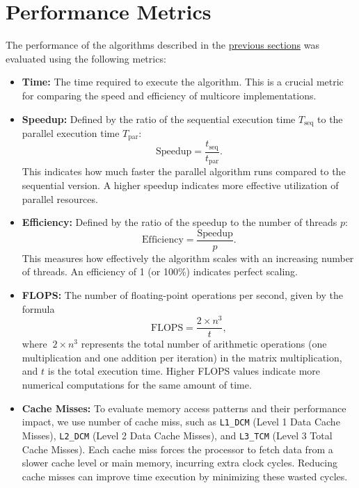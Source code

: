 \section{Performance Metrics}  \label{section:performance}
  The performance of the algorithms described in the \hyperref[section:algorithms]{previous sections} was evaluated using the following metrics:

\begin{itemize}
  \item \textbf{Time:} The time required to execute the algorithm. This is a crucial metric for comparing the speed and efficiency of multicore implementations.
  
  \item \textbf{Speedup:} Defined by the ratio of the sequential execution time $T_{\text{seq}}$ to the parallel execution time $T_{\text{par}}$:
  \[
    \text{Speedup} = \frac{t_{\text{seq}}}{t_{\text{par}}}.
  \]
  This indicates how much faster the parallel algorithm runs compared to the sequential version. A higher speedup indicates more effective utilization of parallel resources.

  \item \textbf{Efficiency:} Defined by the ratio of the speedup to the number of threads $p$:
  \[
    \text{Efficiency} = \frac{\text{Speedup}}{p}.
  \]
  This measures how effectively the algorithm scales with an increasing number of threads. An efficiency of 1 (or 100\%) indicates perfect scaling.

  \item \textbf{FLOPS:} The number of floating-point operations per second, given by the formula 
  \[
    \text{FLOPS} = \frac{2 \times n^3}{t},
  \]
  where \(\ 2 \times n^3\) represents the total number of arithmetic operations (one multiplication and one addition per iteration) in the matrix multiplication, and $t$ is the total execution time. Higher FLOPS values indicate more numerical computations for the same amount of time.

  \item \textbf{Cache Misses:} To evaluate memory access patterns and their performance impact, we use number of cache miss, such as \verb#L1_DCM# (Level 1 Data Cache Misses), \verb#L2_DCM# (Level 2 Data Cache Misses), and \verb#L3_TCM# (Level 3 Total Cache Misses). Each cache miss forces the processor to fetch data from a slower cache level or main memory, incurring extra clock cycles. Reducing cache misses can improve time execution by minimizing these wasted cycles.
\end{itemize}
